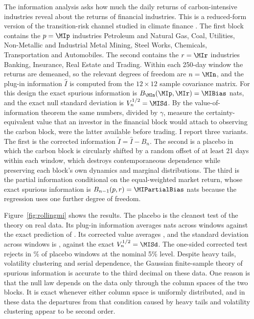 The information analysis asks how much the daily returns of carbon-intensive industries reveal about the returns of financial industries. This is a reduced-form version of the transition-risk channel studied in climate finance \citep{battiston2017climate,engle2020hedging,bolton2021investors,giglio2021climate,pastor2022dissecting}. The first block contains the $p=\MIp$ industries Petroleum and Natural Gas, Coal, Utilities, Non-Metallic and Industrial Metal Mining, Steel Works, Chemicals, Transportation and Automobiles. The second contains the $r=\MIr$ industries Banking, Insurance, Real Estate and Trading. Within each 250-day window the returns are demeaned, so the relevant degrees of freedom are $n=\MIn$, and the plug-in information $\hat I$ is computed from the $12\times12$ sample covariance matrix. For this design the exact spurious information is $B_{\MIn}(\MIp,\MIr)=\MIBias$ nats, and the exact null standard deviation is $V_n^{1/2}=\MISd$. By the value-of-information theorem the same numbers, divided by $\gamma$, measure the certainty-equivalent value that an investor in the financial block would attach to observing the carbon block, were the latter available before trading. I report three variants. The first is the corrected information $\tilde I=\hat I-B_n$. The second is a placebo in which the carbon block is circularly shifted by a random offset of at least 21 days within each window, which destroys contemporaneous dependence while preserving each block's own dynamics and marginal distributions. The third is the partial information conditional on the equal-weighted market return, whose exact spurious information is $B_{n-1}(p,r)=\MIPartialBias$ nats because the regression uses one further degree of freedom.

Figure~\ref{fig:rollingmi} shows the results. The placebo is the cleanest test of the theory on real data. Its plug-in information averages \MINullPlugMean{} nats across windows against the exact prediction of \MIBias{}. Its corrected value averages \MINullCorrMean{}, and the standard deviation across windows is \MINullSd{}, against the exact $V_n^{1/2}=\MISd$. The one-sided corrected test rejects in \MINullRej\% of placebo windows at the nominal 5\% level. Despite heavy tails, volatility clustering and serial dependence, the Gaussian finite-sample theory of spurious information is accurate to the third decimal on these data. One reason is that the null law depends on the data only through the column spaces of the two blocks. It is exact whenever either column space is uniformly distributed, and in these data the departures from that condition caused by heavy tails and volatility clustering appear to be second order.

